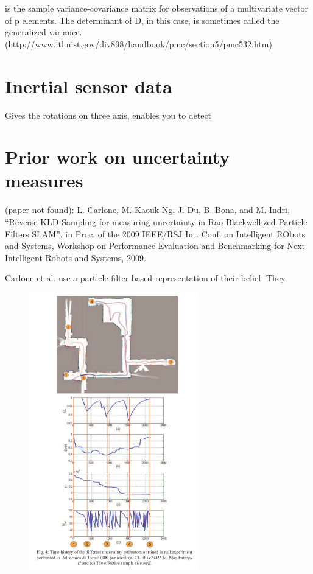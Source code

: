 \documentclass[a4paper, 10pt]{report}
\begin{document}
is the sample variance-covariance matrix for observations of a multivariate vector of p elements. The determinant of D, in this case, is sometimes called the generalized variance. (http://www.itl.nist.gov/div898/handbook/pmc/section5/pmc532.htm)

\section{Inertial sensor data}
Gives the rotations on three axis, enables you to detect 

\section{Prior work on uncertainty measures}
(paper not found): L. Carlone, M. Kaouk Ng, J. Du, B. Bona, and M. Indri, “Reverse KLD-Sampling for measuring uncertainty in Rao-Blackwellized Particle Filters SLAM”, in Proc. of the 2009 IEEE/RSJ Int. Conf. on Intelligent RObots and Systems, Workshop on Performance Evaluation and Benchmarking for Next Intelligent Robots and Systems, 2009.

Carlone et al. use a particle filter based representation of their belief.  They 


\begin{figure}[ht]
  \begin{center}
    \includegraphics[scale=2]{images/poster_SIDRA2009_result.pdf}
  \end{center}
  \caption{}
  \label{fig:carlone}
\end{figure}
\end{document}
